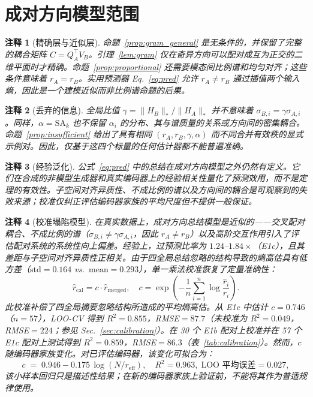 \documentclass{article}
\newcommand{\reff}{\ensuremath{r_{\mathrm{eff}}}\xspace}
\newcommand{\SAk}{\ensuremath{\mathrm{SA}_k}\xspace}
\newtheorem{remark}{注释}
\begin{document}
\section{成对方向模型范围}
\label{app:pa_scope}
\label{app:generalization}
\label{app:calibration}
\label{app:algorithm}

\begin{remark}[精确层与近似层]
命题~\ref{prop:gram_general} 是无条件的，并保留了完整的耦合矩阵 $C=Q_A^\top V_B$。引理~\ref{lem:gram} 仅在奇异方向可以配对成互为正交的二维平面时才精确。命题~\ref{prop:proportional} 还需要模态间比例谱和均匀对齐；这些条件意味着 $r_A=r_B$。实用预测器 Eq.~\eqref{eq:pred} 允许 $r_A \neq r_B$ 通过插值两个输入熵，因此是一个建模近似而非比例谱命题的后果。
\end{remark}
\begin{remark}[丢弃的信息]
全局比值 $\gamma=\|H_B\|_*/\|H_A\|_*$ 并不意味着 $\sigma_{B,i}=\gamma\sigma_{A,i}$。同样，$\alpha=\SAk$ 也不保留 $\alpha_i$ 的分布、其与谱质量的关系或方向间的密集耦合。命题~\ref{prop:insufficient} 给出了具有相同 $(r_A,r_B,\gamma,\alpha)$ 而不同合并有效秩的显式示例对。因此，仅基于这四个标量的任何估计器都不能普遍准确。
\end{remark}

\begin{remark}[经验泛化]
公式~\eqref{eq:pred} 中的总结在成对方向模型之外仍然有定义。它们在合成的非模型生成器和真实编码器上的经验相关性量化了预测效用，而不是定理的有效性。子空间对齐异质性、不成比例的谱以及方向间的耦合是可观察到的失败来源；校准仅纠正评估编码器家族的平均尺度但不提供一般保证。
\end{remark}

\begin{remark}[校准塌陷模型]
\label{rem:calibration}
在真实数据上，成对方向总结模型是近似的——交叉配对耦合、不成比例的谱（$\sigma_{B,i}\neq\gamma\sigma_{A,i}$，因此 $r_A\neq r_B$）以及高阶交互作用引入了评估配对系统的系统性向上偏差。经验上，过预测比率为 $1.24$--$1.84\times$（E1c），且其差距与子空间对齐异质性正相关。由于四全局总结忽略的结构导致的熵高估具有低方差（$\mathrm{std}=0.164$ vs.\ $\mathrm{mean}=0.293$），单一乘法校准恢复了定量准确性：
\begin{equation}
  \hat{r}_{\mathrm{cal}} = c\cdot\hat{r}_{\mathrm{merged}},\quad
  c = \exp\!\left(-\frac{1}{n}\sum_{i=1}^n\log\frac{\hat{r}_i}{r_i}\right).
  \label{eq:calibration}
\end{equation}
此校准补偿了四全局摘要忽略结构所造成的平均熵高估。从 E1c 中估计 $c{=}0.746$（$n{=}57$），LOO-CV 得到 $R^2{=}0.855$，RMSE${=}87.7$（未校准为 $R^2{=}0.049$，RMSE${=}224$；参见 Sec.~\ref{sec:calibration}）。在 30 个 E1b 配对上校准并在 57 个 E1c 配对上测试得到 $R^2{=}0.859$，RMSE${=}86.3$（表~\ref{tab:calibration}）。然而，$c$ 随编码器家族变化。对已评估编码器，该变化可拟合为：
\begin{equation}
  c \;=\; 0.946 - 0.175\,\log(N/\reff),
  \quad R^2{=}0.963,\;\text{LOO 平均误差}{=}0.027,
  \label{eq:universal_c}
\end{equation}
该小样本回归只是描述性结果；在新的编码器家族上验证前，不能将其作为普适规律使用。
\end{remark}
\end{document}
